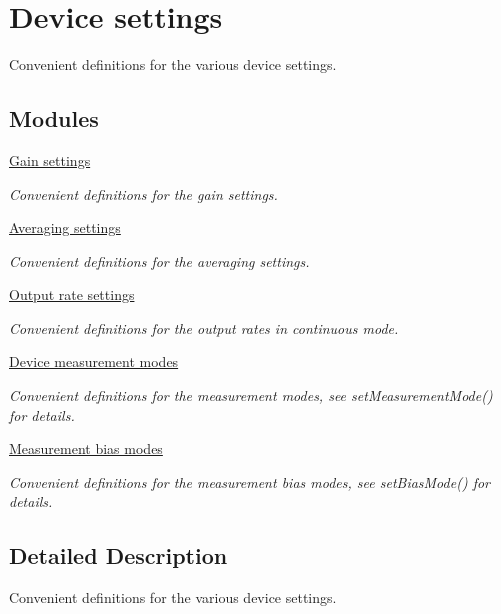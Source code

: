\hypertarget{group___device_settings}{\section{Device settings}
\label{group___device_settings}
}


Convenient definitions for the various device settings.  


\subsection*{Modules}
\begin{DoxyCompactItemize}
\item 
\hyperlink{group___gain_settings}{Gain settings}
\begin{DoxyCompactList}\small\item\em Convenient definitions for the gain settings. \end{DoxyCompactList}\item 
\hyperlink{group___avg_settings}{Averaging settings}
\begin{DoxyCompactList}\small\item\em Convenient definitions for the averaging settings. \end{DoxyCompactList}\item 
\hyperlink{group___output_rates}{Output rate settings}
\begin{DoxyCompactList}\small\item\em Convenient definitions for the output rates in continuous mode. \end{DoxyCompactList}\item 
\hyperlink{group___measurement_modes}{Device measurement modes}
\begin{DoxyCompactList}\small\item\em Convenient definitions for the measurement modes, see {\ttfamily set\+Measurement\+Mode()} for details. \end{DoxyCompactList}\item 
\hyperlink{group___bias_modes}{Measurement bias modes}
\begin{DoxyCompactList}\small\item\em Convenient definitions for the measurement bias modes, see {\ttfamily set\+Bias\+Mode()} for details. \end{DoxyCompactList}\end{DoxyCompactItemize}


\subsection{Detailed Description}
Convenient definitions for the various device settings. 

